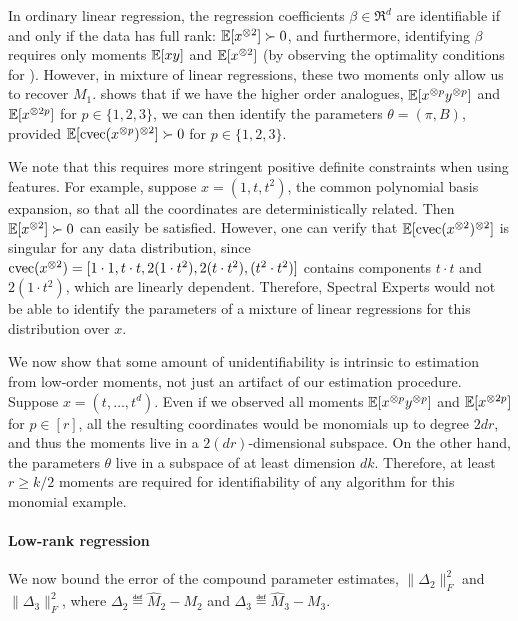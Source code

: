 In ordinary linear regression, the regression coefficients $\beta \in
\Re^d$ are identifiable if and only if the data has full rank:
$\operatorname{\mathbb{E}}[x^{\otimes 2}] \succ 0$, and furthermore, identifying $\beta$ requires
only moments $\operatorname{\mathbb{E}}[xy]$ and $\operatorname{\mathbb{E}}[x^{\otimes 2}]$ (by observing the optimality
conditions for ).  However, in mixture of linear regressions,
these two moments only allow us to recover $M_1$.  
shows that if we have the higher order analogues, $\operatorname{\mathbb{E}}[x^{\otimes p}y^{\otimes p}]$
and $\operatorname{\mathbb{E}}[x^{\otimes 2p}]$ for $p \in \{1,2,3\}$, we can then identify the
parameters $\theta = (\pi, B)$, provided $\operatorname{\mathbb{E}}[\operatorname{cvec}(x^{\otimes p})^{\otimes 2}] \succ
0$ for $p \in \{1,2,3\}$.

We note that this requires more stringent positive definite constraints
when using features. For example, suppose $x = (1, t, t^2)$, the common
polynomial basis expansion, so that all the coordinates are
deterministically related.  Then $\operatorname{\mathbb{E}}[x^{\otimes 2}] \succ 0$ can easily be
satisfied. 
However, one can verify that $\operatorname{\mathbb{E}}[\operatorname{cvec}(x^{\otimes 2})^{\otimes 2}]$ is singular for
any data distribution, since $\operatorname{cvec}(x^{\otimes 2}) = [1 \cdot 1, t\cdot t, 2(1
\cdot t^2), 2(t \cdot t^2), (t^2 \cdot t^2)]$ contains components $t
\cdot t$ and $2(1 \cdot t^2)$, which are linearly dependent.  Therefore,
Spectral Experts would not be able to identify the parameters of
a mixture of linear regressions for this distribution over $x$.

We now show that some amount of unidentifiability is intrinsic to
estimation from low-order moments, not just an artifact of our
estimation procedure.  Suppose $x = (t, \dots, t^d)$.  Even if we
observed all moments $\operatorname{\mathbb{E}}[x^{\otimes p}y^{\otimes p}]$ and $\operatorname{\mathbb{E}}[x^{\otimes 2p}]$ for $p \in
[r]$, all the resulting coordinates would be monomials up to degree
$2dr$, and thus the moments live in a $2(dr)$-dimensional subspace.  On
the other hand, the parameters $\theta$ live in a subspace of at least
dimension $dk$.  Therefore, at least $r \ge k/2$ moments are required
for identifiability of any algorithm for this monomial example.

\paragraph{Low-rank regression}
\vspace{-0.5em}
We now bound the error of
the compound parameter estimates,
$\|\Delta_2\|_F^2$ and $\|\Delta_3\|_F^2$,
where $\Delta_2 \eqdef \hat M_2 - M_2$
and $\Delta_3 \eqdef \hat M_3 - M_3$.

